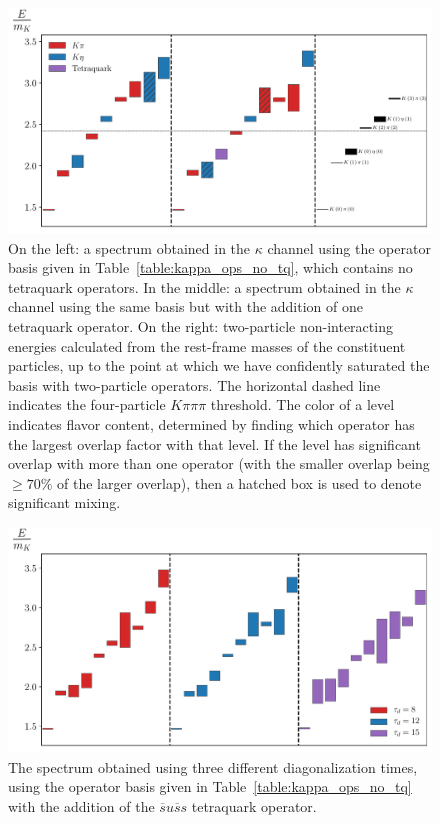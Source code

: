 \begin{figure}
  \centering
  \hspace*{-0.5in}\includegraphics[width=\textwidth]{figures/spectrum_a1g/staircase.pdf}
  \caption{On the left: a spectrum obtained in the $\kappa$ channel using the operator basis given in Table~\ref{table:kappa_ops_no_tq}, which contains no tetraquark operators. In the middle: a spectrum obtained in the $\kappa$ channel using the same basis but with the addition of one tetraquark operator. On the right: two-particle non-interacting energies calculated from the rest-frame masses of the constituent particles, up to the point at which we have confidently saturated the basis with two-particle operators. The horizontal dashed line indicates the four-particle $K\pi\pi\pi$ threshold. The color of a level indicates flavor content, determined by finding which operator has the largest overlap factor with that level. If the level has significant overlap with more than one operator (with the smaller overlap being $\geq 70\%$ of the larger overlap), then a hatched box is used to denote significant mixing.}
  \label{fig:kappa_spectrum}
\end{figure}

\begin{figure}
  \centering
  \hspace*{-0.5in}\includegraphics[width=\textwidth]{figures/spectrum_a1g/staircase_tau_d.pdf}
  \caption{The spectrum obtained using three different diagonalization times, using the operator basis given in Table~\ref{table:kappa_ops_no_tq} with the addition of the $\overline s u \overline s s$ tetraquark operator.}
  \label{fig:spectrum_td}
\end{figure}

